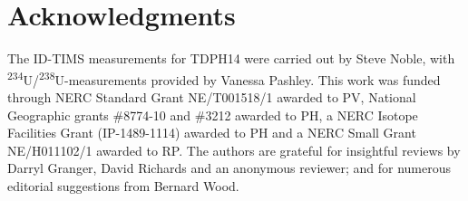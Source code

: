 \documentclass[11pt]{article}
\begin{document}
\section*{Acknowledgments}

The ID-TIMS measurements for TDPH14 were carried out by Steve Noble,
with \textsuperscript{234}U/\textsuperscript{238}U-mea\-su\-re\-ments
provided by Vanessa Pashley.  This work was funded through NERC
Standard Grant NE/T001518/1 awarded to PV, National Geographic grants
\#8774-10 and \#3212 awarded to PH, a NERC Isotope Facilities Grant
(IP-1489-1114) awarded to PH and a NERC Small Grant NE/H011102/1
awarded to RP. The authors are grateful for insightful reviews by
Darryl Granger, David Richards and an anonymous reviewer; and for
numerous editorial suggestions from Bernard Wood.



\end{document}
